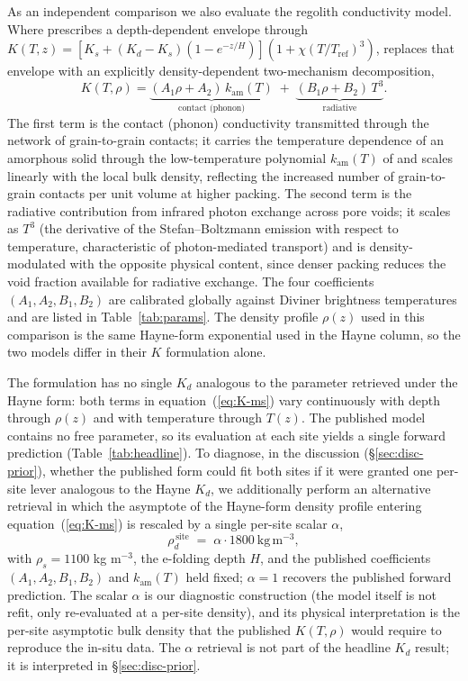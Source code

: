 \documentclass[11pt]{article}
\begin{document}
As an independent comparison we also evaluate the \citet{martinez2021}
regolith conductivity model. Where \citet{hayne2017} prescribes a
depth-dependent envelope through
$K(T,z)=[K_s+(K_d-K_s)(1-e^{-z/H})](1+\chi(T/T_\mathrm{ref})^3)$,
\citet{martinez2021} replaces that envelope with an explicitly
density-dependent two-mechanism decomposition,
\begin{equation}
K(T,\rho) = \underbrace{(A_1\rho + A_2)\,k_\mathrm{am}(T)}_{\text{contact (phonon)}}
          \;+\; \underbrace{(B_1\rho + B_2)\,T^3}_{\text{radiative}}.
\label{eq:K-ms}
\end{equation}
The first term is the contact (phonon) conductivity transmitted through the
network of grain-to-grain contacts; it carries the temperature dependence
of an amorphous solid through the low-temperature polynomial
$k_\mathrm{am}(T)$ of \citet{martinez2021} and scales linearly with the
local bulk density, reflecting the increased number of grain-to-grain
contacts per unit volume at higher packing. The second term is the
radiative contribution from infrared photon exchange across pore voids; it
scales as $T^3$ (the derivative of the Stefan--Boltzmann emission with
respect to temperature, characteristic of photon-mediated transport) and is
density-modulated with the opposite physical content, since denser packing
reduces the void fraction available for radiative exchange. The four
coefficients $(A_1,A_2,B_1,B_2)$ are calibrated globally against Diviner
brightness temperatures and are listed in Table~\ref{tab:params}. The
density profile $\rho(z)$ used in this comparison is the same Hayne-form
exponential used in the Hayne column, so the two models differ in their $K$
formulation alone.

The \citet{martinez2021} formulation has no single $K_d$ analogous to the
parameter retrieved under the Hayne form: both terms in
equation~(\ref{eq:K-ms}) vary continuously with depth through $\rho(z)$ and
with temperature through $T(z)$. The published model contains no free
parameter, so its evaluation at each site yields a single forward
prediction (Table~\ref{tab:headline}). To diagnose, in the discussion
(\S\ref{sec:disc-prior}), whether the published \citet{martinez2021} form
could fit both sites if it were granted one per-site lever analogous to the
Hayne $K_d$, we additionally perform an alternative retrieval in which the
asymptote of the Hayne-form density profile entering
equation~(\ref{eq:K-ms}) is rescaled by a single per-site scalar $\alpha$,
\begin{equation}
\rho_d^{\,\text{site}} \;=\; \alpha\cdot 1800\ \mathrm{kg\,m^{-3}},
\label{eq:alpha}
\end{equation}
with $\rho_s=1100$ kg m$^{-3}$, the e-folding depth $H$, and the published
coefficients $(A_1,A_2,B_1,B_2)$ and $k_\mathrm{am}(T)$ held fixed;
$\alpha=1$ recovers the published forward prediction. The scalar $\alpha$
is our diagnostic construction (the \citet{martinez2021} model itself is
not refit, only re-evaluated at a per-site density), and its physical
interpretation is the per-site asymptotic bulk density that
the published $K(T,\rho)$ would require to reproduce the in-situ data. The
$\alpha$ retrieval is not part of the headline $K_d$ result; it is
interpreted in \S\ref{sec:disc-prior}.
\end{document}
